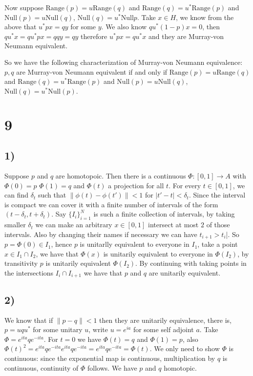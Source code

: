 \documentclass{article}
\begin{document}
Now suppose $\text{Range}(p)=u\text{Range}(q)$ and $\text{Range}(q)=u^\ast \text{Range}(p)$ 
and $\text{Null}(p)=u\text{Null}(q)$, $\text{Null}(q)=u^\ast\text{Null}{p}$.
Take $x\in H$, we know from the above that $u^\ast px=qy$ for some $y$. We also know 
$qu^\ast(1-p)x=0$, then $qu^\ast x=qu^\ast px=qqy=qy$ therefore $u^\ast px=qu^\ast x$ and they 
are Murray-von Neumann equivalent.


So we have the following characterization of Murray-von Neumann equivalence: $p,q$ are 
Murray-von Neumann equivalent if and only if $\text{Range}(p)=u\text{Range}(q)$ and $\text{Range}(q)=u^\ast \text{Range}(p)$ 
and $\text{Null}(p)=u\text{Null}(q)$, $\text{Null}(q)=u^\ast\text{Null}(p)$.



\section*{9}
\subsection*{1)}
Suppose $p$ and $q$ are homotopoic. Then there is a continuous $\Phi:[0,1]\to A$ with $\Phi(0)=p$
$\Phi(1)=q$ and $\Phi(t)$ a projection for all $t$. For every $t\in [0,1]$, we can find $\delta_t$
such that $\|\phi(t)-\phi(t')\|<1$ for $|t'-t|<\delta_t$. Since the interval is compact
we can cover it with a finite number of intervals of the form $(t-\delta_t,t+\delta_t)$. 
Say $\{I_i\}_{i=1}^{N}$ is such a finite collection of intervals, by taking smaller $\delta_t$
we can make an arbitrary $x\in [0,1]$ intersect at most $2$ of those intervals. Also by
changing their names if necessary we can have $t_{i+1}>t_i$|. So $p=\Phi(0)\in I_1$, hence
$p$ is unitarlly equivalent to everyone in $I_1$, take a point $x\in I_1\cap I_2$, we have 
that $\Phi(x)$ is unitarily equivalent to everyone in $\Phi(I_2)$, by transitivity $p$ is 
unitarily equivalent $\Phi(I_2)$. By continuing with taking points in the intersections 
$I_i\cap I_{i+1}$ we have that $p$ and $q$ are unitarily equivalent.  

\subsection*{2)}

We know that if $\|p-q\|<1$ then they are unitarily equivalence, there is, $p=uqu^\ast$ for 
some unitary $u$, write $u=e^{ia}$ for some self adjoint $a$. Take $\Phi=e^{ita}qe^{-ita}$.
For $t=0$ we have $\Phi(t)=q$ and $\Phi(1)=p$, also $\Phi(t)^2=e^{ita}qe^{-ita}e^{ita}qe^{-ita}=
e^{ita}qe^{-ita}=\Phi(t)$. We only need to show $\Phi$ is continuous: since the exponential
map is continuous, multiplication by $q$ is continuous, continuity of $\Phi$ follows. 
We have $p$ and $q$ homotopic.
\end{document}
